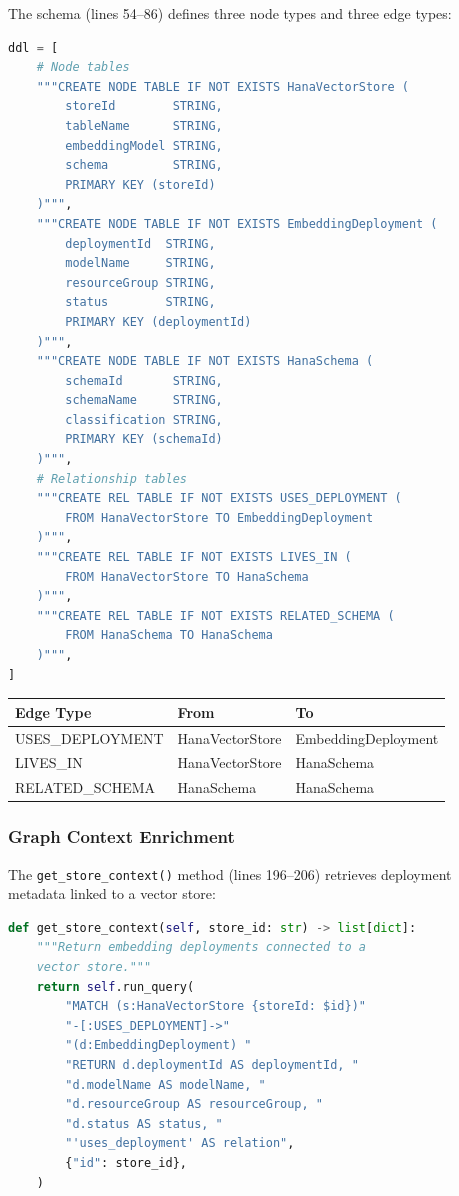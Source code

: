\documentclass[11pt]{article}
\begin{document}
The schema (lines 54--86) defines three node types and three edge types:

\begin{lstlisting}[language=Python,caption={HANA KùzuDB schema --- lines 54--86}]
ddl = [
    # Node tables
    """CREATE NODE TABLE IF NOT EXISTS HanaVectorStore (
        storeId        STRING,
        tableName      STRING,
        embeddingModel STRING,
        schema         STRING,
        PRIMARY KEY (storeId)
    )""",
    """CREATE NODE TABLE IF NOT EXISTS EmbeddingDeployment (
        deploymentId  STRING,
        modelName     STRING,
        resourceGroup STRING,
        status        STRING,
        PRIMARY KEY (deploymentId)
    )""",
    """CREATE NODE TABLE IF NOT EXISTS HanaSchema (
        schemaId       STRING,
        schemaName     STRING,
        classification STRING,
        PRIMARY KEY (schemaId)
    )""",
    # Relationship tables
    """CREATE REL TABLE IF NOT EXISTS USES_DEPLOYMENT (
        FROM HanaVectorStore TO EmbeddingDeployment
    )""",
    """CREATE REL TABLE IF NOT EXISTS LIVES_IN (
        FROM HanaVectorStore TO HanaSchema
    )""",
    """CREATE REL TABLE IF NOT EXISTS RELATED_SCHEMA (
        FROM HanaSchema TO HanaSchema
    )""",
]
\end{lstlisting}

\begin{center}
\begin{tabular}{lll}
\toprule
\textbf{Edge Type} & \textbf{From} & \textbf{To} \\
\midrule
USES\_DEPLOYMENT & HanaVectorStore & EmbeddingDeployment \\
LIVES\_IN & HanaVectorStore & HanaSchema \\
RELATED\_SCHEMA & HanaSchema & HanaSchema \\
\bottomrule
\end{tabular}
\end{center}

\subsubsection{Graph Context Enrichment}

The \texttt{get\_store\_context()} method (lines 196--206) retrieves deployment
metadata linked to a vector store:

\begin{lstlisting}[language=Python,caption={get\_store\_context() --- lines 196--206}]
def get_store_context(self, store_id: str) -> list[dict]:
    """Return embedding deployments connected to a
    vector store."""
    return self.run_query(
        "MATCH (s:HanaVectorStore {storeId: $id})"
        "-[:USES_DEPLOYMENT]->"
        "(d:EmbeddingDeployment) "
        "RETURN d.deploymentId AS deploymentId, "
        "d.modelName AS modelName, "
        "d.resourceGroup AS resourceGroup, "
        "d.status AS status, "
        "'uses_deployment' AS relation",
        {"id": store_id},
    )
\end{lstlisting}
\end{document}
